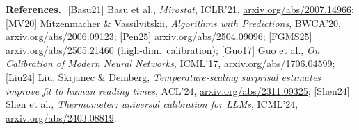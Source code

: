 \documentclass[11pt]{article}
\begin{document}
{\footnotesize\sloppy
\noindent\textbf{References.}\ \,[Basu21] Basu et al., \emph{Mirostat}, ICLR'21, \url{arxiv.org/abs/2007.14966}; [MV20] Mitzenmacher \& Vassilvitskii, \emph{Algorithms with Predictions}, BWCA'20, \url{arxiv.org/abs/2006.09123}; [Pen25] \url{arxiv.org/abs/2504.09096}; [FGMS25] \url{arxiv.org/abs/2505.21460} (high-dim.\ calibration); [Guo17] Guo et al., \emph{On Calibration of Modern Neural Networks}, ICML'17, \url{arxiv.org/abs/1706.04599}; [Liu24] Liu, \v{S}krjanec \& Demberg, \emph{Temperature-scaling surprisal estimates improve fit to human reading times}, ACL'24, \url{arxiv.org/abs/2311.09325}; [Shen24] Shen et al., \emph{Thermometer: universal calibration for LLMs}, ICML'24, \url{arxiv.org/abs/2403.08819}.
\par}
\end{document}
